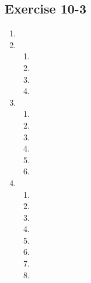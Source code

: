 \subsection{Exercise 10-3} %
\begin{enumerate}[itemsep=6pt, label=\textbf{\arabic*}. ] 
  \item %

   \item %
  \begin{enumerate}[noitemsep, label=\textbf{(\alph*)} ]
    \item %
    \item %
    \item %
    \item %
    \end{enumerate}

  \item %

   
  \begin{enumerate}[noitemsep, label=\textbf{(\alph*)} ]

    \item %
    \item %
    \item %
    \item %
    \item %
    \item %
    \end{enumerate}
\item
  \begin{enumerate}[noitemsep, label=\textbf{(\alph*)} ]
    \item %
    \item %
    \item %
    \item %
    \item %
    \item %
    \item %
    \item %
    \end{enumerate}

 \end{enumerate}

